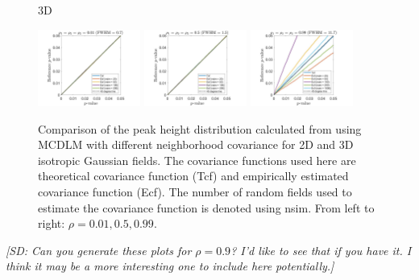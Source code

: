 \documentclass{article}
\newcommand{\sdcom}[1]{\textit{\color{red} [SD: #1]}}
\begin{document}
\begin{figure}[!htp]
\begin{sideways}
\phantom{------------------}3D
\end{sideways}
\includegraphics[trim=80 5 80 5, clip,width=0.3\textwidth]{figure/3D_rho1_0.01_rho2_0.01_rho3_0.01.jpg}
\includegraphics[trim=80 5 80 5, clip,width=0.3\textwidth]{figure/3D_rho1_0.5_rho2_0.5_rho3_0.5.jpg}
\includegraphics[trim=80 5 80 5, clip,width=0.3\textwidth]{figure/3D_rho1_0.99_rho2_0.99_rho3_0.99.jpg}
\caption{Comparison of the peak height distribution calculated from using MCDLM with different neighborhood covariance for 2D and 3D isotropic Gaussian fields. The covariance functions used here are theoretical covariance function (Tcf) and empirically estimated covariance function (Ecf). The number of random fields used to estimate the covariance function is denoted using nsim. From left to right: $\rho = 0.01, 0.5, 0.99$. \label{fig13}}
\end{figure}
\sdcom{Can you generate these plots for $\rho = 0.9$? I'd like to see that if you have it. I think it may be a more interesting one to include here potentially.}
\end{document}
